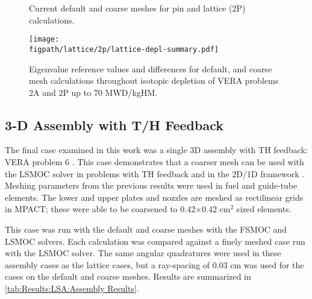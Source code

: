 {{{\begin{figure}[h]
\begin{minipage}{0.75\linewidth}
\begin{subfigure}[t]{0.40\linewidth}
                    \end{subfigure}
                \end{minipage}
                \caption{Current default and coarse meshes for pin and lattice (2P) calculations.}
                \label{fig:Results:LSA:Depletion:Meshes}
            \end{figure}
            \begin{figure}[h]
                \centering
                \texttt{[image: \\figpath/lattice/2p/lattice-depl-summary.pdf]}
                \caption{Eigenvalue reference values and differences for default, and coarse mesh calculations throughout isotopic depletion of VERA problems 2A and 2P up to 70 MWD/kgHM.}
                \label{fig:Results:LSA:Lattice Depletion Results}
            \end{figure}
        }
        \subsection{3-D Assembly with T/H Feedback}{\label{ssec:Results:LSA:3D Assembly with T/H Feedback}
            The final case examined in this work was a single 3D assembly with \ac{TH} feedback: VERA problem 6 \cite{VERAProblems}.
            This case demonstrates that a coarser mesh can be used with the \ac{LSMOC} solver in problems with \ac{TH} feedback and in the 2D/1D framework \cite{Collins2016}.
            Meshing parameters from the previous results were used in fuel and guide-tube elements.
            The lower and upper plates and nozzles are meshed as rectilinear grids in MPACT; these were able to be coarsened to 0.42$\times$0.42 cm$^2$ sized elements.

            This case was run with the default and coarse meshes with the \ac{FSMOC} and \ac{LSMOC} solvers.
            Each calculation was compared against a finely meshed case run with the \ac{LSMOC} solver.
            The same angular quadratures were used in these assembly cases as the lattice cases, but a ray-spacing of 0.03 cm was used for the cases on the default and coarse meshes.
            Results are summarized in \cref{tab:Results:LSA:Assembly Results}.

}}}
